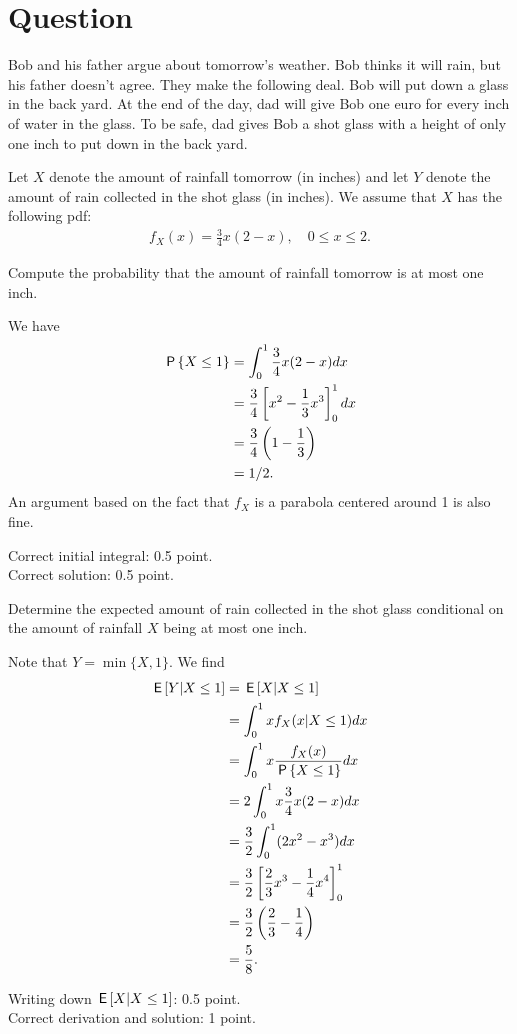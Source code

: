 \section*{Question}

Bob and his father argue about tomorrow's weather. Bob thinks it will rain, but his father doesn't agree. They make the following deal. Bob will put down a glass in the back yard. At the end of the day, dad will give Bob one euro for every inch of water in the glass. To be safe, dad gives Bob a shot glass with a height of only one inch to put down in the back yard.

Let $X$ denote the amount of rainfall tomorrow (in inches) and let $Y$ denote the amount of rain collected in the shot glass (in inches). We assume that $X$ has the following pdf:
\begin{align}
    f_X(x) = \frac{3}{4}x(2-x), \quad 0 \leq x \leq 2.
\end{align}

\begin{exercise}[1]
Compute the probability that the amount of rainfall tomorrow is at most one inch.
\begin{solution}
We have
\begin{align}
    \P{X \leq 1} &= \int_0^1 \frac{3}{4} x (2-x) dx \\
    &=  \frac{3}{4}\left[ x^2 - \frac{1}{3} x^3 \right]_0^1 dx \\
    &=  \frac{3}{4}\left( 1 - \frac{1}{3} \right) \\
    &= 1/2.
\end{align}
An argument based on the fact that $f_X$ is a parabola centered around 1 is also fine.

Correct initial integral: 0.5 point.\\
Correct solution: 0.5 point.
\end{solution}
\end{exercise}

\begin{exercise}[1.5]
Determine the expected amount of rain collected in the shot glass conditional on the amount of rainfall $X$ being at most one inch.
\begin{solution}
Note that $Y = \min\{X,1\}$. We find
\begin{align}
    \E{Y|X\leq 1} &= \E{X|X\leq 1} \\
    &= \int_0^1 x f_X(x|X\leq 1) dx \\
    &= \int_0^1 x \frac{f_X(x)}{\P{X \leq 1}} dx \\
    &= 2 \int_0^1 x \frac{3}{4} x (2-x)  dx \\
    &= \frac{3}{2} \int_0^1 (2x^2 - x^3)  dx \\
    &= \frac{3}{2} \left[ \frac{2}{3} x^3 - \frac{1}{4} x^4\right]_0^1 \\
    &= \frac{3}{2} \left( \frac{2}{3} - \frac{1}{4} \right) \\
    &= \frac{5}{8}.
\end{align}

Writing down $\E{X|X\leq 1}$: 0.5 point.\\
Correct derivation and solution: 1 point.
\end{solution}
\end{exercise}

